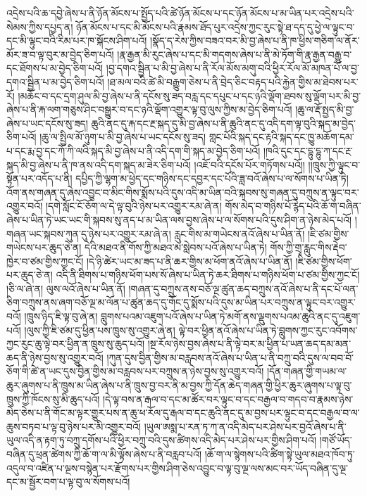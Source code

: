 འདྲེས་པའི་ཆ་དབྱེ་ཞེས་པ་ནི་ཉོན་མོངས་པ་སྤྱོད་པའི་ཚེ་ཉོན་མོངས་པ་དང་ཉོན་མོངས་པ་མ་ཡིན་པར་འདྲེས་པའི་སེམས་ཀྱིས་དཔྱད་ན། ཉོན་མོངས་པ་དང་མི་མོངས་པའི་རྣམས་ཐོད་པུར་འདྲེས་ཀྱང་རུང་སྟེ་ཐ་དད་དུ་ཕྱེ་ལ་ལྟུང་བ་དང་མི་ལྟུང་བའི་རིམ་པར་ཁ་སྐོངས་ཤིག་པའོ། །སྣོད་ད་རེས་ཀྱིས་བཟའ་བར་མི་བྱ་ཞེས་པ་ནི་ཁ་ཕྱིས་གཅིག་ལ་ནོར་མོར་ཟ་བ་ལྟ་བུར་མ་བྱེད་ཅིག་པའོ། །རྣ་རྒྱན་མི་རུང་ཞེས་པ་དང་མི་གདགས་ཞེས་པ་ནི་མེ་ཏོག་གི་རྣ་རྒྱན་བརྒྱུ་བ་དང་ཐོགས་པ་མ་བྱེད་ཅིག་པའོ། །བྱ་དགའ་སྦྱིན་པ་མི་བྱ་ཞེས་པ་ནི་རོལ་མོས་མགུ་བའི་ཕྱིར་རོལ་མོ་མཁན་པོ་ལ་བྱ་དགའ་སྦྱིན་པ་མ་བྱེད་ཅིག་པའོ། །ཐ་མལ་བའི་ཚེ་མི་བརྒྱུག་ཅེས་པ་ནི་བྲེད་ཅིང་བརྟད་པའི་རྐྱེན་གྱིས་མ་ཐེབས་པར་རོ། །མཆོང་བ་དང་དྲག་ཤུལ་མི་བྱ་ཞེས་པ་ནི་དངོས་སུ་ཟད་བརླ་དང་དཔུང་པ་དང་ཉའི་ལྡོག་ཐབས་སུ་ལྡོག་པར་མི་བྱ་ཞེས་པ་ནི་རྐ་ལག་གཅུས་ཤིང་བསྒྱུར་བ་དང་ཉའི་ལྡོག་འགྱུར་ལྟ་བུ་ལུས་ཀྱིས་མ་བྱེད་ཅིག་པའོ། །ཆུ་ལ་རྡོ་སྤྱད་མི་བྱ་ཞེས་པ་ཡང་དངོས་སུ་ཟད། ཆུའི་ནང་དུ་རྐ་དང་རྔ་སྐད་དུ་མི་བྱ་ཞེས་པ་ནི་ཆུའི་ནང་དུ་འདི་དག་ལྟ་བུའི་སྐད་མ་བྱེད་ཅིག་པའོ། །ཆུ་ལ་སྤྱིལ་མོ་ཉུག་པ་མི་བྱ་ཞེས་པ་ཡང་དངོས་སུ་ཟད། གླང་པོའི་སྐད་དང་རྟའི་སྐད་དང་ཁྱུ་མཆོག་དམ་པ་དང་རྨ་བྱ་དང་ཀོ་ཀི་ལའི་སྐད་མི་བྱ་ཞེས་པ་ནི་འདི་དག་གི་སྐད་མ་བྱེད་ཅིག་པའོ། །ཁའི་དུང་དང་དྷུ་དྷུ་ཀ་དང་རྔ་སྐད་མི་བྱ་ཞེས་པ་ནི་ཁ་ནས་འདི་དག་སྐད་མ་ཟེར་ཅིག་པའོ། །འཇོ་བའི་དངོས་པོར་གཏོགས་པའོ།། །།ཁྲུས་ཀྱི་ལྟུང་བ་སྟོན་པར་འདོད་པ་ནི། དཔྱིད་ཀྱི་ལྷག་མ་ཕྱེད་དང་གཉིས་དང་དབྱར་དང་པོའི་ཟླ་བའོ་ཞེས་པ་ལ་སོགས་པ་ཡིན་ཏེ། འོག་ནས་གཞན་དུ་ཞེས་འབྱུང་བ་མིང་གིས་སྨོས་པའི་དུས་འདི་མ་ཡིན་བའི་སྐབས་སུ་གཞན་དུ་བཀྲུས་ན་ལྟུང་བར་འགྱུར་བའོ། །དགེ་སློང་ངོ་ཅོག་ལ་དེ་ལྟ་བུའི་ཉེས་པར་འགྱུར་རམ་ཞེ་ན། གོས་མེད་བ་གཉིས་པོ་རྙེད་པའི་ཆོ་ག་བཞིན་ཞེས་པ་ཡིན་ཏེ་ཡང་ཡང་གི་སྐབས་སུ་ནད་པ་མ་ཡིན་ལས་བྱས་ཞེས་པ་ལ་སོགས་པའི་དུས་ཤིག་ན་ཉེས་མེད་པའོ། །གཞན་ཡང་སྐབས་ཀུན་དུ་ཉེས་པར་འགྱུར་རམ་ཞེ་ན། རླུང་གིས་མ་གཡེངས་ནའོ་ཞེས་པ་ཡིན་ནོ། །ཇི་ཙམ་གྱིས་གཡེངས་པར་ཆུད་ཅེ་ན། དེའི་མཐའ་ནི་གོས་ཀྱི་མཐའ་མ་སླེབས་པའོ་ཞེས་པ་ཡིན་ཏེ། གོས་ཀྱི་གྲྭ་རླུང་གིས་རྡེབ་ཁྱེར་བ་ཙམ་གྱིས་ཀྱང་ངོ། །དེ་ཉི་ཚེར་ཡང་མ་ཟད་པ་ནི་ཆར་གྱིས་མ་ཕོག་ནའོ་ཞེས་པ་ཡིན་ནོ། །ཇི་ཙམ་གྱིས་ཕོག་པར་ཆུད་ཅེ་ན། འདི་ནི་ཐིགས་པ་གཉིས་ཕོག་པས་སོ་ཞེས་པ་ཡིན་ཏེ་ཆར་ཐིགས་པ་གཉིས་ཕོག་པ་ཙམ་གྱིས་ཀྱང་ངོ། །ཅི་ལ་ཞེ་ན། ལུས་ལའོ་ཞེས་པ་ཡིན་ནོ། །གཞན་དུ་བཀྲུས་ནས་བཅོ་ལྔ་ཚུན་ཆད་བཀྲུས་ནའོ་ཞེས་པ་ནི་དང་པོ་ལན་ཅིག་བཀྲུས་ནས་ཞག་བཅོ་ལྔ་མ་ལོན་པ་ཚུན་ཆད་དུ་གོང་དུ་སྨོས་པའི་དུས་མ་ཡིན་པར་བཀྲུས་ན་ལྟུང་བར་འགྱུར་བའོ། །ཁྲུས་ཉིད་ཇི་ལྟ་བུ་ཞེ་ན། བླུགས་པའམ་འཇུག་པའོ་ཞེས་པ་ཡིན་ཏེ་མགོ་ནས་ལྡུགས་པའམ་ཆུའི་ནང་དུ་འཇུག་པའོ། །ལུས་ཀྱི་ཇི་ཙམ་དུ་ཕྱིན་པས་ཁྲུས་སུ་འགྱུར་ཞེ་ན། ལྟེ་བར་ཕྱིན་ནའོ་ཞེས་པ་ཡིན་ཏེ་བླུགས་ཀྱང་རུང་འབོགས་ཀྱང་རུང་ཆུ་ལྟེ་བར་ཕྱིན་ན་ཁྲུས་སུ་ཆུད་པའོ། །སྔ་རོལ་ཉེས་བྱས་ཞེས་པ་ནི་ལྟེ་བར་མ་ཕྱིན་པ་ཡན་ཆད་དམ་མན་ཆད་ནི་ཉེས་བྱས་སུ་འགྱུར་བའོ། །ཀུན་དུས་བྱིན་གྱིས་མ་བརླབས་ནའོ་ཞེས་པ་ཡིན་པ་ནི་བཀྲུ་བའི་དུས་ལ་བབ་བོ་ཅོག་གི་ཚེ་ན་ཡང་དུས་བྱིན་གྱིས་མ་བརླབས་པར་བཀྲུས་ན་ཉེས་བྱས་སུ་འགྱུར་བའོ། །དོན་གཞན་གྱི་གཡམ་ལ་ཆུར་ཞུགས་པ་ནི་ཁྲུས་མ་ཡིན་ཞེས་པ་ནི་ཁྲུས་བྱ་བར་ནི་མ་བྱས་ཀྱི་དོན་ཆེད་གཞན་གྱི་ཕྱིར་ཆུར་ཞུགས་པ་ལྟ་བུ་ཁྲུས་ཀྱི་ཁོངས་སུ་མི་ཆུད་པའོ། །དེ་ལྟ་བས་ན་རྒལ་བ་དང་མ་ཚོར་བར་ལྟུང་བ་དང་བརྒྱལ་བ་གདབ་བ་རྣམས་ཉེས་མེད་ཅེས་པ་ནི་གོང་མ་ལྟར་གྱུར་པས་ན་ཆུ་ཕ་རོལ་དུ་རྒལ་བ་དང་ཆུའི་ནང་དུ་མ་བྱས་པར་ལྟུང་བ་དང་བརྒྱལ་བ་ལ་ཆུས་བཏབ་པ་ལྟ་བུ་ཉེས་པར་མི་འགྱུར་བའོ། །ཡུལ་ཨསྨ་པ་རན་ཏ་ཀ་ན་འདི་མེད་པར་ཤེས་པར་བྱའོ་ཞེས་པ་ནི་ཡུལ་འདི་ན་རྟག་ཏུ་བཀྲུ་དགོས་པའི་ཕྱིར་བཀྲུ་བའི་དུས་ཚིགས་འདི་མེད་པར་ཤེས་པར་གྱིས་ཤིག་པའོ། །གཙོ་ཡོད་བཞིན་དུ་ཕྲན་ཚེགས་ཀྱི་ཆོ་ག་ལ་མི་ལྟོས་ཞེས་པ་ནི་བརླབ་པའོ། །ཆོ་ག་ལ་སྙེགས་པའི་ཚིག་སྟེ་ཡུལ་མཐའ་ཁོབ་ཏུ་འདུལ་བ་འཛིན་པ་ལྔས་བསྙེན་པར་རྫོགས་པར་གྱིས་ཤིག་ཅེས་འབྱུང་བ་ལྟ་བུ་ལྔ་ལས་མང་བར་ཡོད་བཞིན་དུ་ལྔ་དང་མ་སྦྱོར་བག་པ་ལྟ་བུ་ལ་སོགས་པའོ། 